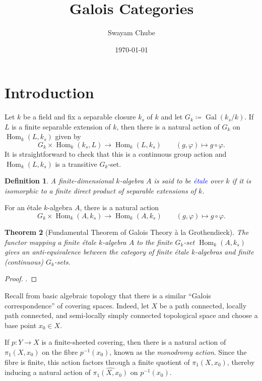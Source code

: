 \documentclass[10pt]{article}
\title{Galois Categories}
\author{Swayam Chube}
\date{\today}
\theoremstyle{thmstyle}
\newtheorem{theorem}{Theorem}[section]
\theoremstyle{defstyle}
\newtheorem{definition}[theorem]{Definition}
\newcommand{\Gal}{\operatorname{Gal}}
\newcommand{\Hom}{\operatorname{Hom}}
\newcommand{\wh}[1]{\widehat{#1}}
\newcommand{\define}[1]{\textcolor{blue}{\textit{#1}}}
\begin{document}
\maketitle

\tableofcontents

\section{Introduction}

Let $k$ be a field and fix a separable closure $k_s$ of $k$ and let $G_k\coloneq\Gal(k_s/k)$. If $L$ is a finite separable extension of $k$, then there is a natural action of $G_k$ on $\Hom_k(L, k_s)$ given by 
\begin{equation*}
    G_k\times\Hom_k(k_s, L)\to \Hom_k(L, k_s)\qquad (g,\varphi)\mapsto g\circ\varphi.
\end{equation*}
It is straightforward to check that this is a continuous group action and $\Hom_k(L, k_s)$ is a transitive $G_k$-set. 
\begin{definition}
    A finite-dimensional $k$-algebra $A$ is said to be \define{\'etale} over $k$ if it is isomorphic to a finite direct product of separable extensions of $k$. 
\end{definition}
For an \'etale $k$-algebra $A$, there is a natural action 
\begin{equation*}
    G_k\times\Hom_k(A, k_s)\to\Hom_k(A, k_s)\qquad (g,\varphi)\mapsto g\circ\varphi.
\end{equation*}

\begin{theorem}[Fundamental Theorem of Galois Theory \`a la Grothendieck]
    The functor mapping a finite \'etale $k$-algebra $A$ to the finite $G_k$-set $\Hom_k(A, k_s)$ gives an anti-equivalence between the category of finite \'etale $k$-algebras and finite (continuous) $G_k$-sets.
\end{theorem}
\begin{proof}
    \cite[Theorem 1.5.4]{szamuely-galois}.
\end{proof}

Recall from basic algebraic topology that there is a similar ``Galois correspondence'' of covering spaces. Indeed, let $X$ be a path connected, locally path connected, and semi-locally simply connected topological space and choose a base point $x_0\in X$. 

If $p: Y\to X$ is a finite-sheeted covering, then there is a natural action of $\pi_1(X, x_0)$ on the fibre $p^{-1}(x_0)$, known as the \emph{monodromy action}. Since the fibre is finite, this action factors through a finite quotient of $\pi_1(X, x_0)$, thereby inducing a natural action of $\wh{\pi_1(X, x_0)}$ on $p^{-1}(x_0)$.
\end{document}
